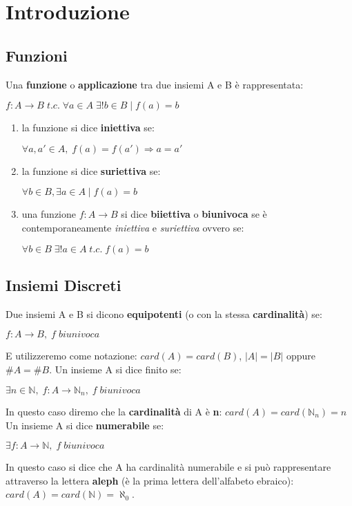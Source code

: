\chapter{Introduzione}

\section{Funzioni}
Una \textbf{funzione} o \textbf{applicazione} tra due insiemi A e B è rappresentata:
\begin{center}
    $f : A \rightarrow B \; t.c. \; \forall a \in A \; \exists ! b \in B \; | \; f(a) = b$
\end{center}
\begin{enumerate}
    \item la funzione si dice \textbf{iniettiva} se:
        \begin{center}
            $\forall a, a' \in A, \; f(a) = f(a') \Rightarrow a = a'$
        \end{center}
    \item la funzione si dice \textbf{suriettiva} se:
        \begin{center}
            $\forall b \in B, \exists a \in A \; | \; f(a) = b$    
        \end{center}
    \item una funzione $f : A \rightarrow B$ si dice \textbf{biiettiva} o \textbf{biunivoca} se è contemporaneamente \textit{iniettiva} e \textit{suriettiva} ovvero se:
        \begin{center}
            $\forall b \in B \; \exists ! a \in A \; t.c. \; f(a) = b $
        \end{center}
\end{enumerate}

\newpage
\section{Insiemi Discreti}
Due insiemi A e B si dicono \textbf{equipotenti} (o con la stessa \textbf{cardinalità}) se:
\begin{center}
    $f : A \rightarrow B, \; f \; biunivoca$
\end{center}
E utilizzeremo come notazione: $card(A) = card(B)$, $|A| = |B|$ oppure $\#A = \#B$.
Un insieme A si dice finito se:
\begin{center}
    $\exists n \in \mathbb{N}, \; f : A \rightarrow \mathbb{N}_n, \; f \; biunivoca$
\end{center}
In questo caso diremo che la \textbf{cardinalità} di A è \textbf{n}: $card(A) = card(\mathbb{N}_n) = n$ \\
Un insieme A si dice \textbf{numerabile} se:
\begin{center}
    $\exists f : A \rightarrow \mathbb{N}, \; f \; biunivoca$
\end{center}
In questo caso si dice che A ha cardinalità numerabile e si può rappresentare attraverso la lettera \textbf{aleph} (è la prima lettera dell'alfabeto ebraico): $card(A) = card(\mathbb{N}) = \aleph_0$.
